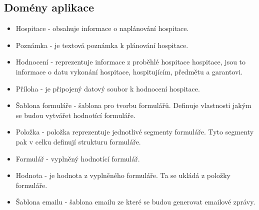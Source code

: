 \subsection{Domény aplikace}
\begin{itemize}
\item Hospitace - obsahuje informace o naplánování hospitace. 
\item Poznámka - je textová poznámka k plánování hospitace.
\item Hodnocení - reprezentuje informace z proběhlé hospitace hospitace, jsou to informace o datu vykonání hospitace, hospitujícím, předmětu a garantovi.
\item Příloha - je připojený datový soubor k hodnocení hospitace.
\item Šablona formuláře - šablona pro tvorbu formulářů. Definuje vlastnosti jakým se budou vytvářet hodnotící formuláře.
\item Položka - položka reprezentuje jednotlivé segmenty formuláře. Tyto segmenty pak v celku definují strukturu formuláře.
\item Formulář - vyplněný hodnotící formulář.
\item Hodnota - je hodnota z vyplněného formuláře. Ta se ukládá z položky formuláře.
\item Šablona emailu - šablona emailu ze které se budou generovat emailové zprávy.
\end{itemize}

